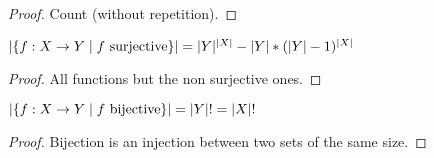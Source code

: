\begin{proof}
	Count (without repetition).
\end{proof}
\begin{property}
	$|  \{f: X \to Y \mid f \text{ surjective} \}  | = | Y |^{| X |} - | Y |*(| Y |-1)^{| X |}$
\end{property}
\begin{proof}
	All functions but the non surjective ones.
\end{proof}
\begin{property}
	$|  \{f: X \to Y \mid f \text{ bijective} \}  | = | Y |! = | X |!$
\end{property}
\begin{proof}
	Bijection is an injection between two sets of the same size.
\end{proof}



